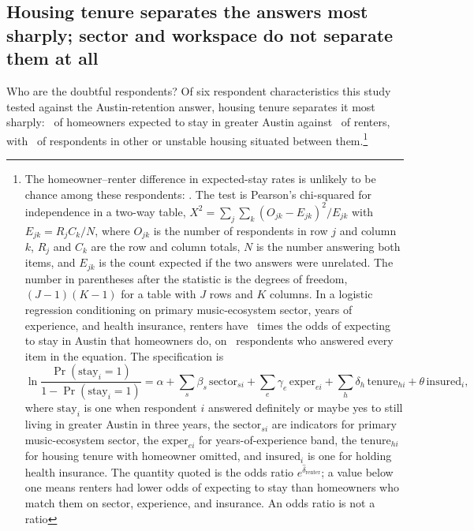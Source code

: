 \subsection{Housing tenure separates the answers most sharply; sector and workspace do not separate them at all}

Who are the doubtful respondents? Of six respondent characteristics this study
tested against the Austin-retention answer, housing tenure separates it most
sharply: \NCensusStayHousingTenureHomeowner\ of homeowners expected to stay in
greater Austin against \NCensusStayHousingTenureRenter\ of renters, with
\NCensusStayHousingTenureOtherOrUnstableHousing\ of respondents in other or
unstable housing situated between them.\footnote{The homeowner--renter
difference in expected-stay rates is unlikely to be chance among these
respondents: \NCensusStaychiTwoHousingTenure. The test is Pearson's
chi-squared for independence in a two-way table,
\(X^{2} = \sum_{j}\sum_{k}(O_{jk} - E_{jk})^{2}/E_{jk}\) with
\(E_{jk} = R_j C_k / N\), where \(O_{jk}\) is the number of respondents in row
\(j\) and column \(k\), \(R_j\) and \(C_k\) are the row and column totals,
\(N\) is the number answering both items, and \(E_{jk}\) is the count expected
if the two answers were unrelated. The number in parentheses after the
statistic is the degrees of freedom, \((J-1)(K-1)\) for a table with \(J\)
rows and \(K\) columns. In a logistic regression conditioning on primary
music-ecosystem sector, years of experience, and health insurance, renters
have \NCensusLogitRenterOr\ times the odds of expecting to stay in Austin
that homeowners do, on \NCensusLogitN\ respondents who answered every item in
the equation. The specification is
\[
\ln\frac{\Pr(\mathrm{stay}_i = 1)}{1 - \Pr(\mathrm{stay}_i = 1)}
  = \alpha + \sum_s \beta_s\,\mathrm{sector}_{si}
  + \sum_e \gamma_e\,\mathrm{exper}_{ei}
  + \sum_h \delta_h\,\mathrm{tenure}_{hi}
  + \theta\,\mathrm{insured}_i ,
\]
where \(\mathrm{stay}_i\) is one when respondent \(i\) answered definitely or
maybe yes to still living in greater Austin in three years, the
\(\mathrm{sector}_{si}\) are indicators for primary music-ecosystem sector,
the \(\mathrm{exper}_{ei}\) for years-of-experience band, the
\(\mathrm{tenure}_{hi}\) for housing tenure with homeowner omitted, and
\(\mathrm{insured}_i\) is one for holding health insurance. The quantity
quoted is the odds ratio \(e^{\hat\delta_{\mathrm{renter}}}\); a value below
one means renters had lower odds of expecting to stay than homeowners who
match them on sector, experience, and insurance. An odds ratio is not a ratio
}
